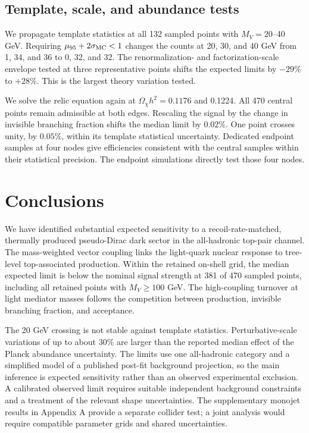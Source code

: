 \documentclass[aps,prd,reprint,superscriptaddress,longbibliography,floatfix]{revtex4-2}
\begin{document}
\subsection{Template, scale, and abundance tests}

We propagate template statistics at all 132 sampled points with $M_V=20$--40 GeV. Requiring $\mu_{95}+2\sigma_{\rm MC}<1$ changes the counts at 20, 30, and 40 GeV from 1, 34, and 36 to 0, 32, and 32. The renormalization- and factorization-scale envelope tested at three representative points shifts the expected limits by $-29\%$ to $+28\%$. This is the largest theory variation tested.

We solve the relic equation again at $\Omega_\chi h^2=0.1176$ and 0.1224. All 470 central points remain admissible at both edges. Rescaling the signal by the change in invisible branching fraction shifts the median limit by $0.02\%$. One point crosses unity, by $0.05\%$, within its template statistical uncertainty. Dedicated endpoint samples at four nodes give efficiencies consistent with the central samples within their statistical precision. The endpoint simulations directly test those four nodes.

\section{Conclusions}
\label{sec:conclusions}

We have identified substantial expected sensitivity to a recoil-rate-matched, thermally produced pseudo-Dirac dark sector in the all-hadronic top-pair channel. The mass-weighted vector coupling links the light-quark nuclear response to tree-level top-associated production. Within the retained on-shell grid, the median expected limit is below the nominal signal strength at 381 of 470 sampled points, including all retained points with $M_V\ge100$ GeV. The high-coupling turnover at light mediator masses follows the competition between production, invisible branching fraction, and acceptance.

The 20 GeV crossing is not stable against template statistics. Perturbative-scale variations of up to about 30\% are larger than the reported median effect of the Planck abundance uncertainty. The limits use one all-hadronic category and a simplified model of a published post-fit background projection, so the main inference is expected sensitivity rather than an observed experimental exclusion. A calibrated observed limit requires suitable independent background constraints and a treatment of the relevant shape uncertainties. The supplementary monojet results in Appendix A provide a separate collider test; a joint analysis would require compatible parameter grids and shared uncertainties.
\end{document}
